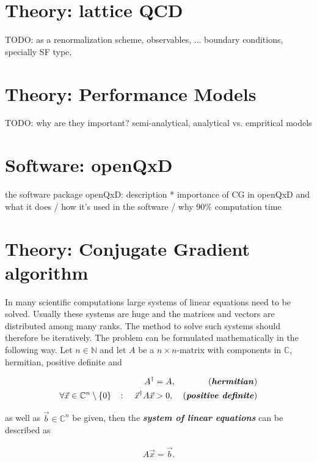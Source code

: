 \documentclass{article}
\theoremstyle{plain} %
\theoremstyle{remark} %
\def\df#1{\textbf{\textit{#1}}}
\numberwithin{equation}{section}
\begin{document}
\section{Theory: lattice QCD}

TODO: as a renormalization scheme, observables, ...
boundary conditions, specially SF type, 

\section{Theory: Performance Models}

TODO: why are they important? semi-analytical, analytical vs. empritical models

\section{Software: openQxD}

the software package openQxD: description
  * importance of CG in openQxD and what it does / how it's used in the software / why 90\% computation time

\section{Theory: Conjugate Gradient algorithm}

In many scientific computations large systems of linear equations need to be solved. Usually these systems are huge and the matrices and vectors are distributed among many \glspl{rank}. The method to solve such systems should therefore be iteratively. The problem can be formulated mathematically in the following way. Let $n \in \mathbb{N}$ and let $A$ be a $n \times n$-matrix with components in $\mathbb{C}$, hermitian, positive definite and 

\begin{align*}
    A^{\dagger} &= A, &\text{(\df{hermitian})} \\
    \forall \vec{x} \in \mathbb{C}^n \setminus \{0\} \quad \colon \quad \vec{x}^{\dagger} A \vec{x} &> 0, &\text{(\df{positive definite})}
\end{align*}

as well as $\vec{b} \in \mathbb{C}^n$ be given, then the \df{system of linear equations} can be described as

\begin{align}
    A \vec{x} = \vec{b}. \label{eq:Axb}
\end{align}
\end{document}
